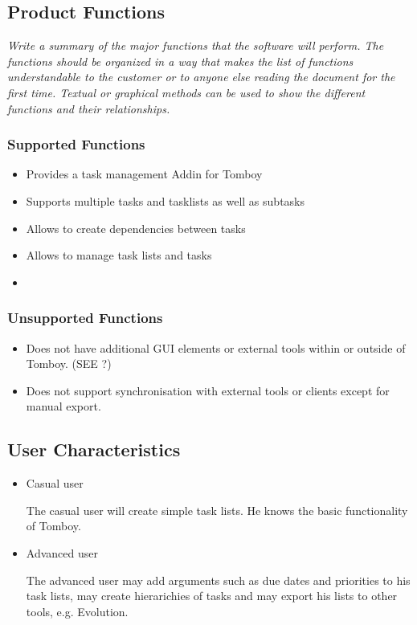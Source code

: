 \subsection{Product Functions}
\label{description:functions}
\textit{
Write a summary of the major functions that the software will perform. The functions should be organized in a way that makes the list of functions understandable to the customer or to anyone else reading the document for the first time. Textual or graphical methods can be used to show the different functions and their relationships.
}
	\subsubsection*{Supported Functions}
	\label{description:functions:supported}
	\begin{itemize}
		\item Provides a task management Addin for Tomboy
                \item Supports multiple tasks and tasklists as well as subtasks
                \item Allows to create dependencies between tasks
                \item Allows to manage task lists and tasks
                \item 
	\end{itemize}

	\subsubsection*{Unsupported Functions}
	\label{description:functions:unsupported}
	\begin{itemize}
		\item Does not have additional GUI elements or external tools within or outside of Tomboy. (SEE ?)
		\item Does not support synchronisation with external tools or clients except for manual export.
	\end{itemize}
	

\subsection{User Characteristics}
\label{description:usercharacteristics}
\begin{itemize}
\item Casual user

The casual user will create simple task lists. He knows the basic functionality of Tomboy.

\item Advanced user

The advanced user may add arguments such as due dates and priorities to his task lists, may create hierarichies of tasks and may export his lists to other tools, e.g. Evolution.
\end{itemize}


